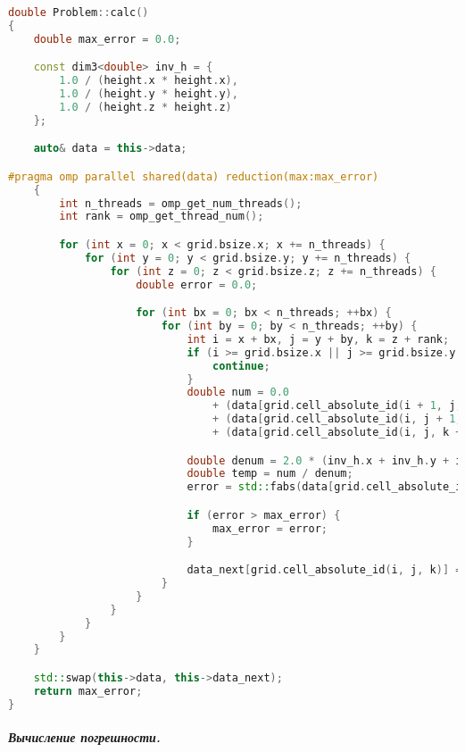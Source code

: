 \documentclass[12pt]{article}
\begin{document}
\begin{lstlisting}[language=c++,basicstyle=\scriptsize]
double Problem::calc()
{
    double max_error = 0.0;

    const dim3<double> inv_h = {
        1.0 / (height.x * height.x),
        1.0 / (height.y * height.y),
        1.0 / (height.z * height.z)
    };

    auto& data = this->data;

#pragma omp parallel shared(data) reduction(max:max_error)
    {
        int n_threads = omp_get_num_threads();
        int rank = omp_get_thread_num();

        for (int x = 0; x < grid.bsize.x; x += n_threads) {
            for (int y = 0; y < grid.bsize.y; y += n_threads) {
                for (int z = 0; z < grid.bsize.z; z += n_threads) {
                    double error = 0.0;

                    for (int bx = 0; bx < n_threads; ++bx) {
                        for (int by = 0; by < n_threads; ++by) {
                            int i = x + bx, j = y + by, k = z + rank;
                            if (i >= grid.bsize.x || j >= grid.bsize.y || k >= grid.bsize.z) {
                                continue;
                            }
                            double num = 0.0
                                + (data[grid.cell_absolute_id(i + 1, j, k)] + data[grid.cell_absolute_id(i - 1, j, k)]) * inv_h.x
                                + (data[grid.cell_absolute_id(i, j + 1, k)] + data[grid.cell_absolute_id(i, j - 1, k)]) * inv_h.y
                                + (data[grid.cell_absolute_id(i, j, k + 1)] + data[grid.cell_absolute_id(i, j, k - 1)]) * inv_h.z;

                            double denum = 2.0 * (inv_h.x + inv_h.y + inv_h.z);
                            double temp = num / denum;
                            error = std::fabs(data[grid.cell_absolute_id(i, j, k)] - temp);

                            if (error > max_error) {
                                max_error = error;
                            }

                            data_next[grid.cell_absolute_id(i, j, k)] = temp;
                        }
                    }
                }
            }
        }
    }

    std::swap(this->data, this->data_next);
    return max_error;
}
\end{lstlisting}

\subparagraph*{Вычисление погрешности.}
\end{document}
